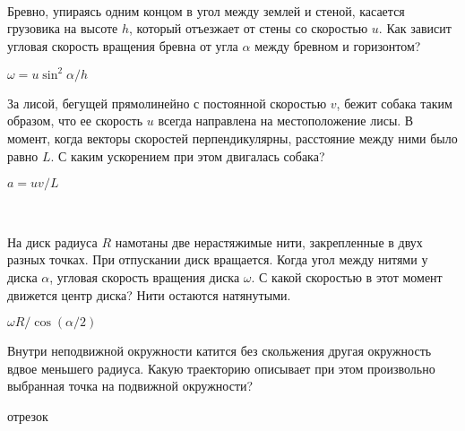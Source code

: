 \begin{ex}
\hspace{0pt} \\
\begin{minipage}{.65\textwidth}
Бревно, упираясь одним концом в угол между землей и стеной, касается грузовика на высоте $h$, который отъезжает от стены со скоростью $u$. Как зависит угловая скорость вращения бревна от угла $\alpha$ между бревном и горизонтом?
\end{minipage}
\begin{minipage}{.35\textwidth}
\centering

\end{minipage}
\begin{ans}
$\omega = u \sin^2 \alpha /h$
\end{ans}
\end{ex}

\begin{ex}
За лисой, бегущей прямолинейно с постоянной скоростью $v$, бежит собака таким образом, что ее скорость $u$ всегда направлена на местоположение лисы. В момент, когда векторы скоростей перпендикулярны, расстояние между ними было равно $L$. С каким ускорением при этом двигалась собака?
\begin{ans}
$a = uv/L$
\end{ans}
\end{ex}

\begin{ex} 
\hspace{0pt} \\
\begin{minipage}{.65\textwidth}
На диск радиуса $R$ намотаны две нерастяжимые нити, закрепленные в двух разных точках. При отпускании диск вращается. Когда угол между нитями у диска $\alpha$, угловая скорость вращения диска $\omega$. С какой скоростью в этот момент движется центр диска? Нити остаются натянутыми.
\end{minipage}
\begin{minipage}{.35\textwidth}
\centering

\end{minipage}
\begin{ans}
$\omega R/ \cos (\alpha /2)$
\end{ans}
\end{ex}

\begin{ex}
Внутри неподвижной окружности катится без скольжения другая окружность вдвое меньшего радиуса. Какую траекторию описывает при этом произвольно выбранная точка на подвижной окружности?
\begin{ans}
отрезок
\end{ans}
\end{ex}

